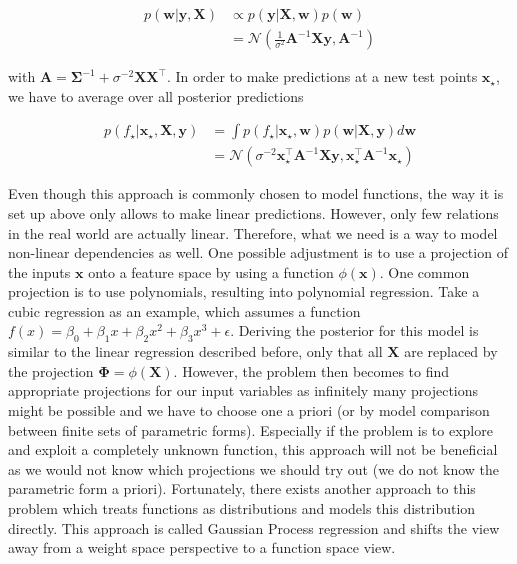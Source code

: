 \documentclass[authoryear,11pt,review]{elsarticle}
\begin{document}
\begin{align*}
p(\mathbf{w}|\mathbf{y,X}) & \propto p(\mathbf{y}|\mathbf{X,w})p(\mathbf{w})\\
&=\mathcal{N}(\frac{1}{\sigma^2}\mathbf{A}^{-1}\mathbf{Xy}, \mathbf{A}^{-1})
\end{align*}

with $\mathbf{A}=\mathbf{\Sigma}^{-1}+\sigma^{-2}\mathbf{XX}^{\top}$. In order to make predictions at a new test points $\mathbf{x}_\star$, we have to average over all posterior predictions

\begin{align*}
p(f_\star|\mathbf{x}_\star, \mathbf{X},\mathbf{y})&=\int p(f_\star|\mathbf{x}_\star,\mathbf{w})p(\mathbf{w}|\mathbf{X},\mathbf{y})d\mathbf{w}\\
&=\mathcal{N}(\sigma^{-2}\mathbf{x}_\star^{\top} \mathbf{A}^{-1} \mathbf{Xy},\mathbf{x}_\star^{\top} \mathbf{A}^{-1}\mathbf{x}_\star)
\end{align*}

Even though this approach is commonly chosen to model functions, the way it is set up above only allows to make linear predictions. However, only few relations in the real world are actually linear. Therefore, what we need is a way to model non-linear dependencies as well. One possible adjustment is to use a projection of the inputs $\mathbf{x}$ onto a feature space by using a function $\phi(\mathbf{x})$. One common projection is to use polynomials, resulting into polynomial regression. Take a cubic regression as an example, which assumes a function $f(x)=\beta_0+\beta_1x+\beta_2x^2+\beta_3x^3+\epsilon$. Deriving the posterior for this model is similar to the linear regression described before, only that all  $\mathbf{X}$ are replaced by the projection $\mathbf{\Phi}=\phi(\mathbf{X})$. However, the problem then becomes to find appropriate projections for our input variables as infinitely many projections might be possible and we have to choose one a priori (or by model comparison between finite sets of parametric forms). Especially if the problem is to explore and exploit a completely unknown function, this approach will not be beneficial as we would not know which projections we should try out (we do not know the parametric form a priori). Fortunately, there exists another approach to this problem which treats functions as distributions and models this distribution directly. This approach is called Gaussian Process regression and shifts the view away from a weight space perspective to a function space view.
\end{document}
